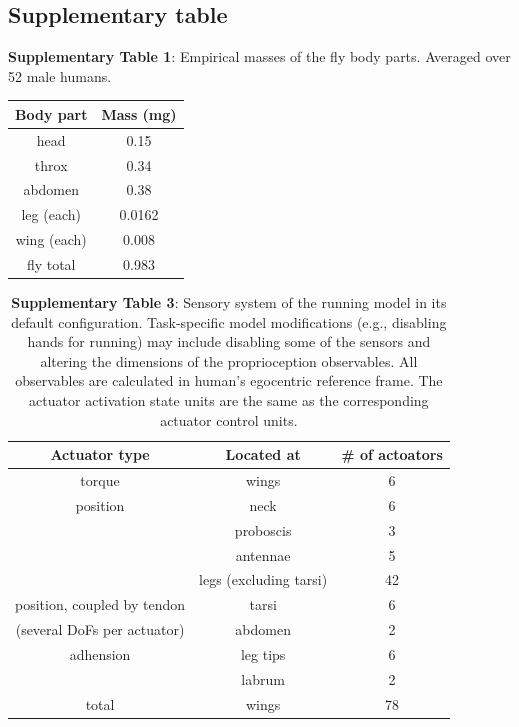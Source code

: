 \documentclass[sn-mathphys-num]{sn-jnl}%
\theoremstyle{thmstyleone}%
\theoremstyle{thmstyletwo}%
\theoremstyle{thmstylethree}%
\begin{document}
\begin{appendices}
\subsection{Supplementary table}\label{secA1}




\textbf{Supplementary Table 1}: Empirical masses of the fly body parts. 
Averaged over 52 male humans.

\begin{table}[htbp]
	\centering
	\small
	\begin{tabular}{cc}
		\toprule
		Body part         &        Mass (mg)     \\
		\midrule
		head      &   0.15      \\
		throx      &   0.34      \\
		abdomen      &   0.38      \\
		leg (each)      &   0.0162      \\
		wing (each)      &   0.008      \\
		\midrule
		fly total      &   0.983      \\
		
		\bottomrule
	\end{tabular}%
	\label{tab:s_1}%
\end{table}%





\begin{table}[htbp]
	\centering
	\small
	\caption{%
		\textbf{Supplementary Table 3}: 
		Sensory system of the running model in its default configuration. 
		Task-specific model modifications (e.g., disabling hands for running) may include disabling some of the sensors and altering the dimensions of the proprioception observables. 
		All observables are calculated in human's egocentric reference frame. 
		The actuator activation state units are the same as the corresponding actuator control units.}
	\begin{tabular}{ccc}
		\toprule
		Actuator type         &        Located at  & \# of actoators     \\
		\midrule
		torque      &   wings      &      6  \\
		position      &   neck      &      6  \\
		      &   proboscis      &      3  \\
		      &   antennae      &      5  \\
		      &   legs (excluding tarsi)      &      42  \\
		\midrule
		position, coupled by tendon      &   tarsi      &      6  \\
		(several DoFs per actuator)      &   abdomen      &      2  \\
		\midrule
		adhension      &   leg tips      &      6  \\
		      &   labrum      &      2  \\
		\midrule
		total      &   wings      &      78  \\
		

\end{tabular}
\end{table}
\end{appendices}
\end{document}
